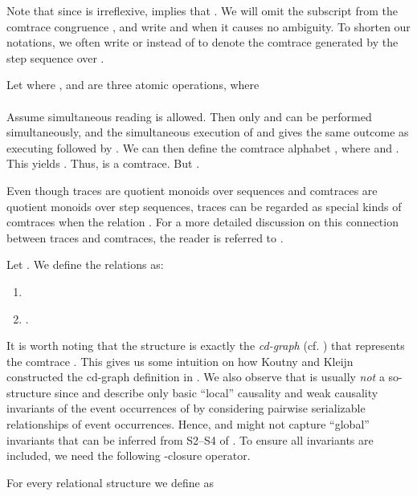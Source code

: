 \documentclass{llncs}
\begin{document}
Note that since  is irreflexive,  implies that . We will omit the subscript  from the comtrace congruence , and write  and  when it causes no ambiguity. To shorten our notations, we often write  or  instead of  to denote the comtrace generated by the step sequence  over .

\begin{example}
Let  where ,  and  are three atomic operations, where\smallskip\\
\smallskip\\
Assume simultaneous reading is allowed. Then only  and  can be performed simultaneously, and the simultaneous execution of  and  gives the same outcome as executing  followed by .
 We can then define the comtrace alphabet , where
 and . This yields .
Thus,  is a comtrace.
But . \EOD
\label{ex:comtrace1}
\end{example}

Even though traces are quotient monoids over sequences and comtraces are
quotient monoids over step sequences, traces can be regarded as special kinds
of comtraces when the relation . For a more detailed discussion on this connection between traces and comtraces, the reader is referred to \cite{JL09}.

\begin{definition}[\cite{JK95}]
Let . We define the relations 
as:
\begin{enumerate}
\item


\item
. \EOD
\end{enumerate}

\label{def:s2inv}
\end{definition}

It is worth noting that the structure  is exactly the \emph{cd-graph} (cf. ) that represents the comtrace . This gives us some intuition on how Koutny and Kleijn constructed the cd-graph definition in \cite{KK08}. We  also observe that  is usually \emph{not} a so-structure since  and  describe only basic ``local'' causality and weak causality invariants of the event occurrences of  by considering pairwise serializable relationships of event occurrences. Hence,  and  might not capture ``global'' invariants that can be inferred from \textsf{S2}--\textsf{S4} of . To ensure  all invariants are included, we need the following -closure operator. 

\begin{definition}[\cite{JK95}]
For every relational structure  we define  as\smallskip\\
\mbox{\hspace{2cm}} \EOD
\label{def:SO-CL}
\end{definition}
\end{document}
